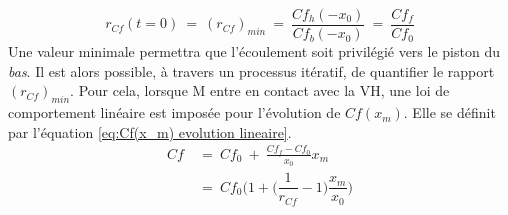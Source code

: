 \begin{equation}
r_{Cf}(t=0)\ =\ (r_{Cf})_{min}\ =\ \frac{Cf_h(-x_0)}{Cf_b(-x_0)}\ =\ \frac{Cf_f}{Cf_0} 
\label{eq:(r_Cf)_min}
\end{equation}
Une valeur minimale permettra que l'écoulement soit privilégié vers le piston du \emph{bas}. Il est alors possible, à travers un processus itératif, de quantifier le rapport $(r_{Cf})_{min}$. Pour cela, lorsque M entre en contact avec la VH, une loi de comportement linéaire est imposée pour l'évolution de $Cf(x_m)$. Elle se définit par l'équation \ref{eq:Cf(x_m) evolution lineaire}.
\begin{align}
Cf\ &=\ Cf_0\ +\ \frac{Cf_f-Cf_0}{x_0}x_m \\
	&=\ Cf_0\biggl(1+\biggl(\dfrac{1}{r_{Cf}}-1\biggr)\dfrac{x_m}{x_0}\biggr)
\label{eq:Cf(x_m) evolution lineaire}
\end{align}	

